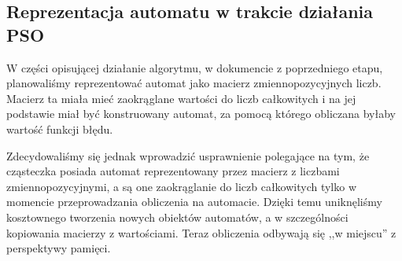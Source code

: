 \documentclass{../llncs_template/llncs}
\begin{document}
\subsection{Reprezentacja automatu w trakcie działania PSO}

W części opisującej działanie algorytmu, w dokumencie z poprzedniego etapu, planowaliśmy reprezentować automat jako macierz zmiennopozycyjnych liczb. Macierz ta miała mieć zaokrąglane wartości do liczb całkowitych i na jej podstawie miał być konstruowany automat, za pomocą którego obliczana byłaby wartość funkcji błędu.

Zdecydowaliśmy się jednak wprowadzić usprawnienie polegające na tym, że cząsteczka posiada automat reprezentowany przez macierz z liczbami zmiennopozycyjnymi, a są one zaokrąglanie do liczb całkowitych tylko w momencie przeprowadzania obliczenia na automacie. Dzięki temu uniknęliśmy kosztownego tworzenia nowych obiektów automatów, a w szczególności kopiowania macierzy z wartościami. Teraz obliczenia odbywają się ,,w miejscu'' z perspektywy pamięci.
\end{document}
